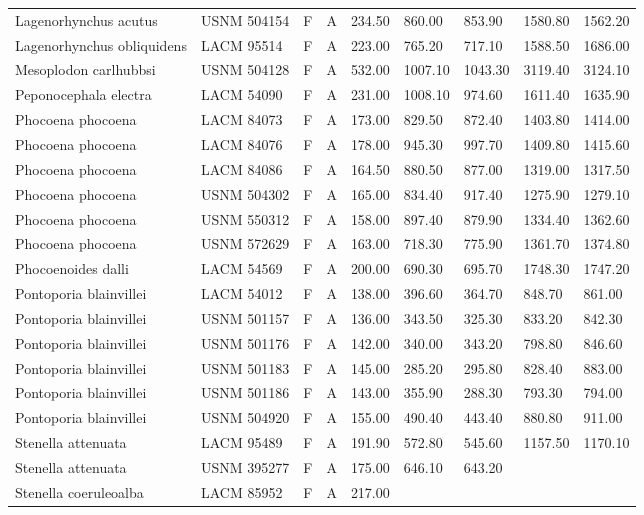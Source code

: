 \begin{longtable}{|p{1in}p{.8in}p{.25in}p{.25in}p{.5in}p{.5in}p{.5in}p{.5in}p{.55in}|}
   Lagenorhynchus acutus & USNM 504154 & F & A & 234.50 & 860.00 & 853.90 & 1580.80 & 1562.20 \\ 
   Lagenorhynchus obliquidens & LACM 95514 & F & A & 223.00 & 765.20 & 717.10 & 1588.50 & 1686.00 \\ 
   Mesoplodon carlhubbsi & USNM 504128 & F & A & 532.00 & 1007.10 & 1043.30 & 3119.40 & 3124.10 \\ 
   Peponocephala electra & LACM 54090 & F & A & 231.00 & 1008.10 & 974.60 & 1611.40 & 1635.90 \\ 
   Phocoena phocoena & LACM 84073 & F & A & 173.00 & 829.50 & 872.40 & 1403.80 & 1414.00 \\ 
   Phocoena phocoena & LACM 84076 & F & A & 178.00 & 945.30 & 997.70 & 1409.80 & 1415.60 \\ 
   Phocoena phocoena & LACM 84086 & F & A & 164.50 & 880.50 & 877.00 & 1319.00 & 1317.50 \\ 
   Phocoena phocoena & USNM 504302 & F & A & 165.00 & 834.40 & 917.40 & 1275.90 & 1279.10 \\ 
   Phocoena phocoena & USNM 550312 & F & A & 158.00 & 897.40 & 879.90 & 1334.40 & 1362.60 \\ 
   Phocoena phocoena & USNM 572629 & F & A & 163.00 & 718.30 & 775.90 & 1361.70 & 1374.80 \\ 
   Phocoenoides dalli & LACM 54569 & F & A & 200.00 & 690.30 & 695.70 & 1748.30 & 1747.20 \\ 
   Pontoporia blainvillei & LACM 54012 & F & A & 138.00 & 396.60 & 364.70 & 848.70 & 861.00 \\ 
   Pontoporia blainvillei & USNM 501157 & F & A & 136.00 & 343.50 & 325.30 & 833.20 & 842.30 \\ 
   Pontoporia blainvillei & USNM 501176 & F & A & 142.00 & 340.00 & 343.20 & 798.80 & 846.60 \\ 
   Pontoporia blainvillei & USNM 501183 & F & A & 145.00 & 285.20 & 295.80 & 828.40 & 883.00 \\ 
   Pontoporia blainvillei & USNM 501186 & F & A & 143.00 & 355.90 & 288.30 & 793.30 & 794.00 \\ 
   Pontoporia blainvillei & USNM 504920 & F & A & 155.00 & 490.40 & 443.40 & 880.80 & 911.00 \\ 
   Stenella attenuata & LACM 95489 & F & A & 191.90 & 572.80 & 545.60 & 1157.50 & 1170.10 \\ 
   Stenella attenuata & USNM 395277 & F & A & 175.00 & 646.10 & 643.20 &  &  \\ 
   Stenella coeruleoalba & LACM 85952 & F & A & 217.00 &  &  &  &  \\ 

\end{longtable}
